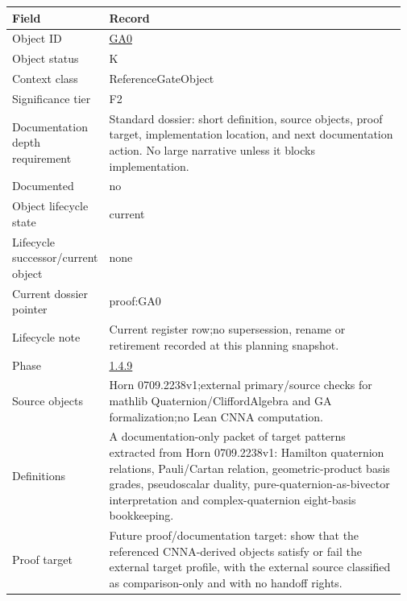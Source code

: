 \begin{longtable}{L{0.16\linewidth} L{0.81\linewidth}}
\hline
\textbf{Field} & \textbf{Record}\\
\hline
Object ID & \hyperlink{object-row-GA0}{GA0}\\
\hline\addlinespace[0.20em]
Object status & K\\
\hline\addlinespace[0.20em]
Context class & ReferenceGateObject\\
\hline\addlinespace[0.20em]
Significance tier & F2\\
\hline\addlinespace[0.20em]
Documentation depth requirement & Standard dossier: short definition, source objects, proof target, implementation location, and next documentation action. No large narrative unless it blocks implementation.\\
\hline\addlinespace[0.20em]
Documented & no\\
\hline\addlinespace[0.20em]
Object lifecycle state & current\\
\hline\addlinespace[0.20em]
Lifecycle successor/\allowbreak{}current object & none\\
\hline\addlinespace[0.20em]
Current dossier pointer & proof:GA0\\
\hline\addlinespace[0.20em]
Lifecycle note & Current register row;\newline no supersession, rename or retirement recorded at this planning snapshot.\\
\hline\addlinespace[0.20em]
Phase & \hyperlink{phase-row-1-4-9}{1.4.9}\\
\hline\addlinespace[0.20em]
Source objects & Horn 0709.2238v1;\newline external primary/\allowbreak{}source checks for mathlib Quaternion/\allowbreak{}CliffordAlgebra and GA formalization;\newline no Lean CNNA computation.\\
\hline\addlinespace[0.20em]
Definitions & A documentation-only packet of target patterns extracted from Horn 0709.2238v1: Hamilton quaternion relations, Pauli/\allowbreak{}Cartan relation, geometric-product basis grades, pseudoscalar duality, pure-quaternion-as-bivector interpretation and complex-quaternion eight-basis bookkeeping.\\
\hline\addlinespace[0.20em]
Proof target & Future proof/\allowbreak{}documentation target: show that the referenced CNNA-derived objects satisfy or fail the external target profile, with the external source classified as comparison-only and with no handoff rights.\\

\end{longtable}
